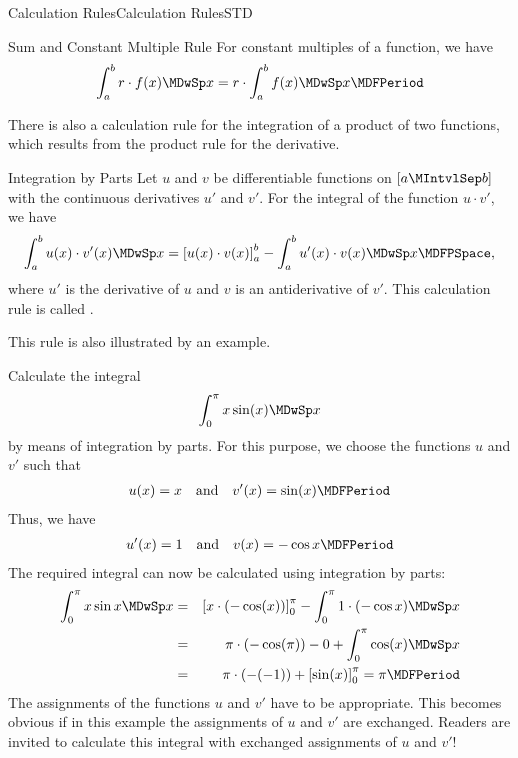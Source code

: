 \begin{MXContent}{Calculation Rules}{Calculation Rules}{STD}
\begin{MXInfo}{Sum and Constant Multiple Rule}
For constant multiples of a function, we have
\begin{equation}
\int_a^b r \cdot f(x) \MDwSp x = r \cdot \int_a^b f(x) \MDwSp x \MDFPeriod %
\end{equation}
\end{MXInfo}

\begin{MCOSHZusatz}

There is also a calculation rule for the integration of a product of two functions, which results from the product rule for the derivative.

\begin{MXInfo}{Integration by Parts}
Let $u$ and $v$ be differentiable functions on $[a\MIntvlSep b]$ with the 
continuous derivatives $u'$ and $v'$. For the integral of the function 
$u \cdot v'$, we have
%
$$
\int_a^b u(x) \cdot v'(x) \MDwSp x %
 = \left[u(x)\cdot v(x)\right]_a^b - \int_a^b u'(x) \cdot v(x) \MDwSp x \MDFPSpace, %
$$
%
where $u'$ is the derivative of $u$ and $v$ is an antiderivative of $v'$. 
This calculation rule is called .
\end{MXInfo}

This rule is also illustrated by an example.

\begin{MExample}
Calculate the integral
%
$$
\int_{0}^{\pi} x \sin(x) \MDwSp x
$$
%
by means of integration by parts. For this purpose, we choose the functions 
$u$ and $v'$ such that
%
\begin{eqnarray*}
u(x) = x \quad \text{and} \quad v'(x) = \sin(x) \MDFPeriod %
\end{eqnarray*}
%
Thus, we have
%
\begin{eqnarray*}
u'(x) = 1 \quad\text{and}\quad v(x) = -\cos x \MDFPeriod
\end{eqnarray*}
%
The required integral can now be calculated using integration by parts:
%
\begin{eqnarray*}
\int_{0}^{\pi} x \sin x \MDwSp x %
& = & \left[x \cdot (-\cos(x))\right]_0^\pi %
      - \int_{0}^{\pi} 1 \cdot (-\cos x) \MDwSp x \\
& = & \pi \cdot (-\cos(\pi)) - 0 + \int_{0}^{\pi} \cos(x) \MDwSp x \\
& = & \pi \cdot (-(-1)) + \left[\sin(x)\right]_0^\pi = \pi \MDFPeriod
\end{eqnarray*}
%
The assignments of the functions $u$ and $v'$ have to be appropriate. This becomes 
obvious if in this example the assignments of $u$ and  $v'$ are exchanged. 
Readers are invited to calculate this integral with exchanged assignments 
of $u$ and $v'$!
\end{MExample}


\end{MCOSHZusatz}
\end{MXContent}
